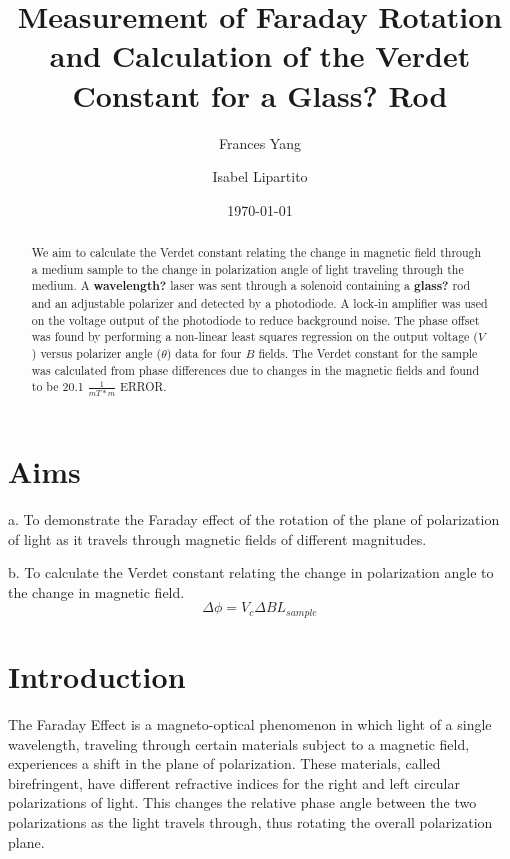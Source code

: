 \documentclass[prb,preprint]{revtex4-1}
\begin{document}
\title{Measurement of Faraday Rotation and Calculation of the Verdet Constant for a Glass? Rod}

\author{Frances Yang}

\author{Isabel Lipartito}

\date{\today}

\begin{abstract}
We aim to calculate the Verdet constant relating the change in magnetic field through a medium sample to the change in polarization angle of light traveling through the medium.  A {\bf wavelength?} laser was sent through a solenoid containing a {\bf glass?} rod and an adjustable polarizer and detected by a photodiode. A lock-in amplifier was used on the voltage output of the photodiode to reduce background noise. The phase offset was found by performing a non-linear least squares regression on the output voltage ($V$) versus polarizer angle ($\theta$) data for four $B$ fields. The Verdet constant for the sample was calculated from phase differences due to changes in the magnetic fields and found to be 20.1 $\frac{1}{mT*m}$ ERROR. 
\end{abstract}

\maketitle 
\section{Aims}
a.  To demonstrate the Faraday effect of the rotation of the plane of polarization of light as it travels through magnetic fields of different magnitudes.

b.  To calculate the Verdet constant relating the change in polarization angle to the change in magnetic field.
\begin{equation}
\Delta \phi =V_{c} \Delta B L{_{sample}}
\end{equation}

\section{Introduction} 

{The Faraday Effect is a magneto-optical phenomenon in which light of a single wavelength, traveling through certain materials subject to a magnetic field, experiences a shift in the plane of polarization. These materials, called birefringent, have different refractive indices for the right and left circular polarizations of light. This changes the relative phase angle between the two polarizations as the light travels through, thus rotating the overall polarization plane.}
\end{document}
